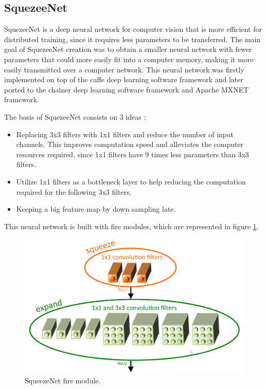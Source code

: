     \subsection{SquezeeNet}
    \label{SquezeeeNet}

    SquezeeNet is a deep neural network for computer vision that is more efficient for distributed training, since it requires less parameters to be transferred. The main goal of SquezeeNet creation was to obtain a smaller neural network with fewer parameters that could more easily fit into a computer memory, making it more easily transmitted over a computer network. This neural network was firstly implemented on top of the caffe deep learning software framework and later ported to the chainer deep learning software framework and Apache MXNET framework.\par
    The basis of SquezeeNet consists on 3 ideas \cite{Iandola2016}:

    \begin{itemize}
        \item Replacing 3x3 filters with 1x1 filters and reduce the number of input channels. This improves computation speed and alleviates the computer resources required, since 1x1 filters have 9 times less parameters than 3x3 filters.
        \item Utilize 1x1 filters as a bottleneck layer to help reducing the computation required for the following 3x3 filters.
        \item Keeping a big feature map by down sampling late.
    \end{itemize}

    

    This neural network is built with fire modules, which are represented in figure \ref{fig:firemodule}. 


    \begin{figure}[htb]
        \centering
        \includegraphics[scale = 0.17]{Sections/2StateOfTheArt/2_images/firemodule.png}
        \caption{SqueezeNet fire module. \cite{Iandola2016} }  
        \label{fig:firemodule}
    \end{figure}

